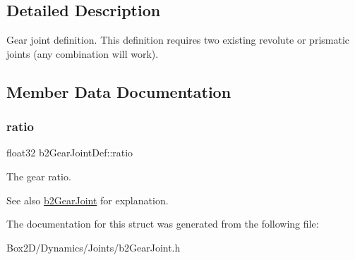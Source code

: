 \subsection{Detailed Description}
Gear joint definition. This definition requires two existing revolute or prismatic joints (any combination will work). 

\subsection{Member Data Documentation}
\mbox{\label{structb2_gear_joint_def_a57e9f4b6ce1ddc8b89b8455515f69323}} 
\subsubsection{\texorpdfstring{ratio}{ratio}}
{\footnotesize\ttfamily float32 b2\+Gear\+Joint\+Def\+::ratio}

The gear ratio. \begin{DoxySeeAlso}{See also}
\hyperlink{classb2_gear_joint}{b2\+Gear\+Joint} for explanation. 
\end{DoxySeeAlso}


The documentation for this struct was generated from the following file\+:\begin{DoxyCompactItemize}
\item 
Box2\+D/\+Dynamics/\+Joints/b2\+Gear\+Joint.\+h\end{DoxyCompactItemize}
